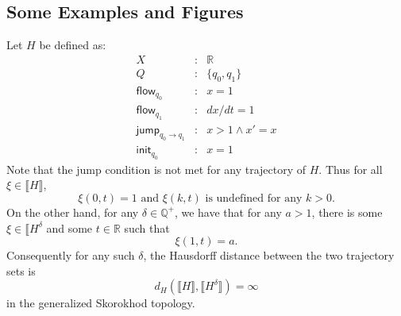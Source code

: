 \documentclass[envcountsect]{llncs}
\newcommand{\flow}{\mathsf{flow}}
\newcommand{\jump}{\mathsf{jump}}
\newcommand{\init}{\mathsf{init}}
\begin{document}
\subsection*{Some Examples and Figures}
\begin{example}
Let $H$ be defined as:
\begin{eqnarray*}
X &:& \mathbb{R}\\
Q &:& \{q_0, q_1\}\\
\flow_{q_0} &:& x = 1\\
\flow_{q_1} &:& dx/dt = 1\\
\jump_{q_0\rightarrow q_1} &:& x >1 \wedge x' = x\\
\init_{q_0} &:& x=1
\end{eqnarray*}
Note that the jump condition is not met for any trajectory of $H$. Thus for all
$\xi\in \llbracket H\rrbracket$,
$$\xi(0, t) = 1\mbox{ and }\xi(k,t)\mbox{ is undefined for any $k>0$.}$$
On the other hand, for any $\delta\in \mathbb{Q}^+$, we have that for any $a >
1$, there is some $\xi\in \llbracket H^{\delta}$ and some $t\in \mathbb{R}$ such
that
$$\xi(1, t) = a.$$
Consequently for any such $\delta$, the Hausdorff distance between the two
trajectory sets is
$$d_{H}(\llbracket H\rrbracket, \llbracket H^{\delta}\rrbracket) = \infty$$
in the generalized Skorokhod topology.
\end{example}
\end{document}
